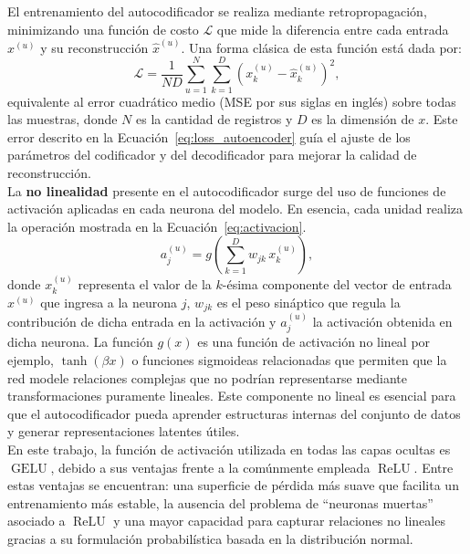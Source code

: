 \documentclass[a4paper,10pt]{book}
\begin{document}
El entrenamiento del autocodificador se realiza mediante retropropagación, minimizando una función de costo $\mathcal{L}$ que mide la diferencia entre cada entrada $x^{(u)}$ y su reconstrucción $\hat{x}^{(u)}$. Una forma clásica de esta función está dada por:
\begin{equation}
	\mathcal{L} = \frac{1}{ND} \sum_{u=1}^{N} \sum_{k=1}^{D} \left( x^{(u)}_k - \hat{x}^{(u)}_k \right)^{2},
	\label{eq:loss_autoencoder}
\end{equation}
equivalente al error cuadrático medio (MSE por sus siglas en inglés) sobre todas las muestras, donde $N$ es la cantidad de registros y $D$ es la dimensión de $x$. Este error descrito en la Ecuación~\ref{eq:loss_autoencoder} guía el ajuste de los parámetros del codificador y del decodificador para mejorar la calidad de reconstrucción.\\

La \textbf{no linealidad} presente en el autocodificador surge del uso de funciones de activación aplicadas en cada neurona del modelo. En esencia, cada unidad realiza la operación mostrada en la Ecuación~\ref{eq:activacion}.
\begin{equation}
	a_j^{(u)} = g\!\left( \sum_{k=1}^{D} w_{jk} \, x_k^{(u)} \right),
	\label{eq:activacion}
\end{equation}
donde $x_k^{(u)}$ representa el valor de la $k$-ésima componente del vector de entrada $x^{(u)}$ que ingresa a la neurona $j$, $w_{jk}$ es el peso sináptico que regula la contribución de dicha entrada en la activación y $a_j^{(u)}$ la activación obtenida en dicha neurona.
La función $g(x)$ es una función de activación no lineal por ejemplo, $\tanh(\beta x)$ o funciones sigmoideas relacionadas que permiten que la red modele relaciones complejas que no podrían representarse mediante transformaciones puramente lineales. Este componente no lineal es esencial para que el autocodificador pueda aprender estructuras internas del conjunto de datos y generar representaciones latentes útiles.\\

En este trabajo, la función de activación utilizada en todas las capas ocultas es $\operatorname{GELU}$, debido a sus ventajas frente a la comúnmente empleada $\operatorname{ReLU}$. Entre estas ventajas se encuentran: una superficie de pérdida más suave que facilita un entrenamiento más estable, la ausencia del problema de ``neuronas muertas'' asociado a $\operatorname{ReLU}$ y una mayor capacidad para capturar relaciones no lineales gracias a su formulación probabilística basada en la distribución normal.\\
\end{document}
